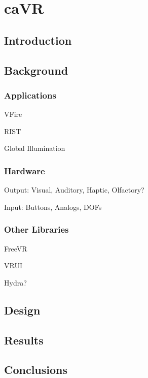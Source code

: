 \chapter{caVR}
\label{chapter:cavr}

\section{Introduction}

\section{Background}

\subsection{Applications}

VFire~\cite{vfire}

RIST~\cite{rist}

Global Illumination~\cite{global_illumination}

\subsection{Hardware}

Output: Visual, Auditory, Haptic, Olfactory?

Input: Buttons, Analogs, DOFs

\subsection{Other Libraries}

FreeVR~\cite{freevr}

VRUI~\cite{vrui}

Hydra?

\section{Design}

\section{Results}

\section{Conclusions}
